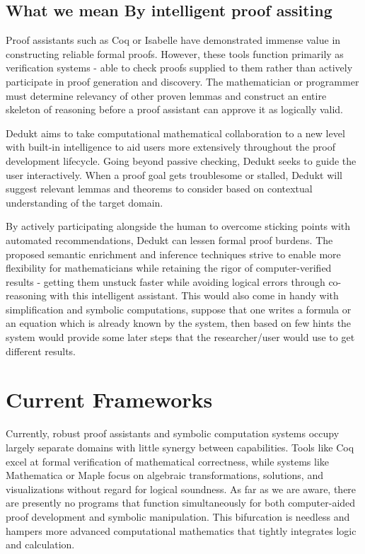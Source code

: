 \documentclass[9pt,a4paper,twocolumn]{article}
\newcounter{theo}
\begin{document}
    \subsection{What we mean By intelligent proof assiting}
        Proof assistants such as Coq or Isabelle have demonstrated immense value in constructing reliable formal proofs. However, these tools function primarily as verification systems - able to check proofs supplied to them rather than actively participate in proof generation and discovery. The mathematician or programmer must determine relevancy of other proven lemmas and construct an entire skeleton of reasoning before a proof assistant can approve it as logically valid. 
        
        Dedukt aims to take computational mathematical collaboration to a new level with built-in intelligence to aid users more extensively throughout the proof development lifecycle. Going beyond passive checking, Dedukt seeks to guide the user interactively. When a proof goal gets troublesome or stalled, Dedukt will suggest relevant lemmas and theorems to consider based on contextual understanding of the target domain. 
        
        By actively participating alongside the human to overcome sticking points with automated recommendations, Dedukt can lessen formal proof burdens. The proposed semantic enrichment and inference techniques strive to enable more flexibility for mathematicians while retaining the rigor of computer-verified results - getting them unstuck faster while avoiding logical errors through co-reasoning with this intelligent assistant. This would also come in handy with simplification and symbolic computations, suppose that one writes a formula or an equation which is already known by the system, then based on few hints the system would provide some later steps that the researcher/user would use to get different results.
    
\section{Current Frameworks}

    Currently, robust proof assistants and symbolic computation systems occupy largely separate domains with little synergy between capabilities. Tools like Coq excel at formal verification of mathematical correctness, while systems like Mathematica or Maple focus on algebraic transformations, solutions, and visualizations without regard for logical soundness. As far as we are aware, there are presently no programs that function simultaneously for both computer-aided proof development and symbolic manipulation. This bifurcation is needless and hampers more advanced computational mathematics that tightly integrates logic and calculation.
\end{document}
